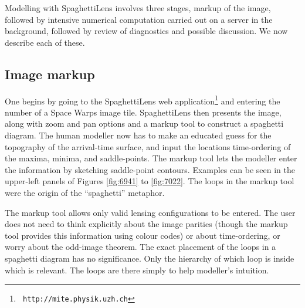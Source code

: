 \documentclass[usenatbib]{mn2e}
\newcommand{\spl}{SpaghettiLens\xspace}
\newcommand{\sw}{Space Warps\xspace}
\begin{document}
%
%

Modelling with \spl involves three stages, markup of the image,
followed by intensive numerical computation carried out on a
server in the background, followed by review
of diagnostics and possible discussion.  We now describe each of
these.



\subsection{Image markup}

One begins by going to the \spl web application\footnote{\tt
http://mite.physik.uzh.ch} and entering the number of a
\sw image tile.  \spl then presents the image, along with zoom and pan
options and a markup tool to construct a spaghetti diagram.  The human
modeller now has to make an educated guess for the topography of the
arrival-time surface, and input the locations time-ordering of the
maxima, minima, and saddle-points.  The markup tool \citep[which is
inspired by Figure~6 of][and is like that figure made interactive and
overlaid on data]{1986ApJ...310..568B} lets the modeller enter the
information by sketching saddle-point contours.  Examples can be seen
in the upper-left panels of Figures \ref{fig:6941} to \ref{fig:7022}. 
The loops in the markup tool were the origin of the ``spaghetti''
metaphor.

The markup tool allows only valid lensing configurations to be
entered.  The user does not need to think explicitly about the image
parities (though the markup tool provides this information using
colour codes) or about time-ordering, or worry about the odd-image
theorem.  The exact placement of the loops in a spaghetti diagram has
no significance.  Only the hierarchy of which loop is inside which is
relevant.  The loops are there simply to help modeller's intuition.
\end{document}
